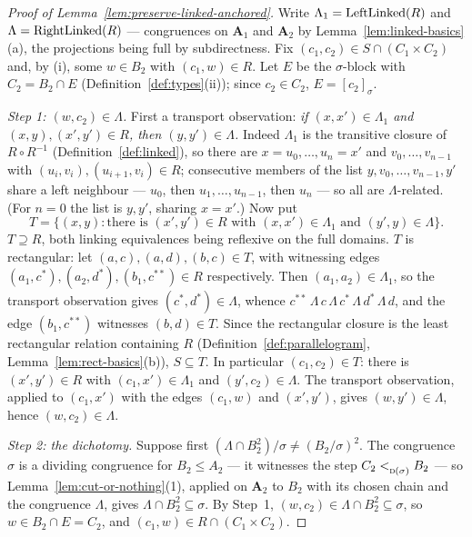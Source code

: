 \begin{proof}[Proof of Lemma~\ref{lem:preserve-linked-anchored}]
Write $\Lambda_{1}=\operatorname{LeftLinked}(R)$ and $\Lambda=\operatorname{RightLinked}(R)$ ---
congruences on $\mathbf A_{1}$ and $\mathbf A_{2}$ by
Lemma~\ref{lem:linked-basics}(a), the projections being full by
subdirectness. Fix $(c_{1},c_{2})\in S\cap(C_{1}\times C_{2})$ and, by (i),
some $w\in B_{2}$ with $(c_{1},w)\in R$. Let $E$ be the $\sigma$-block with
$C_{2}=B_{2}\cap E$ (Definition~\ref{def:types}(ii)); since $c_{2}\in C_{2}$,
$E=[c_{2}]_{\sigma}$.

\emph{Step 1: $(w,c_{2})\in\Lambda$.} First a transport observation:
\emph{if $(x,x')\in\Lambda_{1}$ and $(x,y),(x',y')\in R$, then
$(y,y')\in\Lambda$.} Indeed $\Lambda_{1}$ is the transitive closure of
$R\circ R^{-1}$ (Definition~\ref{def:linked}), so there are
$x=u_{0},\dots,u_{n}=x'$ and $v_{0},\dots,v_{n-1}$ with
$(u_{i},v_{i}),(u_{i+1},v_{i})\in R$; consecutive members of the list
$y,v_{0},\dots,v_{n-1},y'$ share a left neighbour --- $u_{0}$, then
$u_{1},\dots,u_{n-1}$, then $u_{n}$ --- so all are $\Lambda$-related.
(For $n=0$ the list is $y,y'$, sharing $x=x'$.) Now put
\[
  T=\{(x,y):\text{there is }(x',y')\in R\text{ with }
    (x,x')\in\Lambda_{1}\text{ and }(y',y)\in\Lambda\} .
\]
$T\supseteq R$, both linking equivalences being reflexive on the full
domains. $T$ is rectangular: let $(a,c),(a,d),(b,c)\in T$, with witnessing
edges $(a_{1},c^{*}),(a_{2},d^{*}),(b_{1},c^{**})\in R$ respectively. Then
$(a_{1},a_{2})\in\Lambda_{1}$, so the transport observation gives
$(c^{*},d^{*})\in\Lambda$, whence
$c^{**}\,\Lambda\,c\,\Lambda\,c^{*}\,\Lambda\,d^{*}\,\Lambda\,d$, and the
edge $(b_{1},c^{**})$ witnesses $(b,d)\in T$. Since the rectangular closure
is the least rectangular relation containing $R$
(Definition~\ref{def:parallelogram}, Lemma~\ref{lem:rect-basics}(b)),
$S\subseteq T$. In particular $(c_{1},c_{2})\in T$: there is
$(x',y')\in R$ with $(c_{1},x')\in\Lambda_{1}$ and $(y',c_{2})\in\Lambda$.
The transport observation, applied to $(c_{1},x')$ with the edges
$(c_{1},w)$ and $(x',y')$, gives $(w,y')\in\Lambda$, hence
$(w,c_{2})\in\Lambda$.

\emph{Step 2: the dichotomy.} Suppose first
$(\Lambda\cap B_{2}^{2})/\sigma\neq(B_{2}/\sigma)^{2}$. The congruence
$\sigma$ is a dividing congruence for $B_{2}\le A_{2}$ --- it witnesses the
step $C_{2}<_{\textup{\textsc{d}}(\sigma)}^{}B_{2}$ --- so
Lemma~\ref{lem:cut-or-nothing}(1), applied on $\mathbf A_{2}$ to $B_{2}$
with its chosen chain and the congruence $\Lambda$, gives
$\Lambda\cap B_{2}^{2}\subseteq\sigma$. By Step~1,
$(w,c_{2})\in\Lambda\cap B_{2}^{2}\subseteq\sigma$, so
$w\in B_{2}\cap E=C_{2}$, and $(c_{1},w)\in R\cap(C_{1}\times C_{2})$.


\end{proof}

